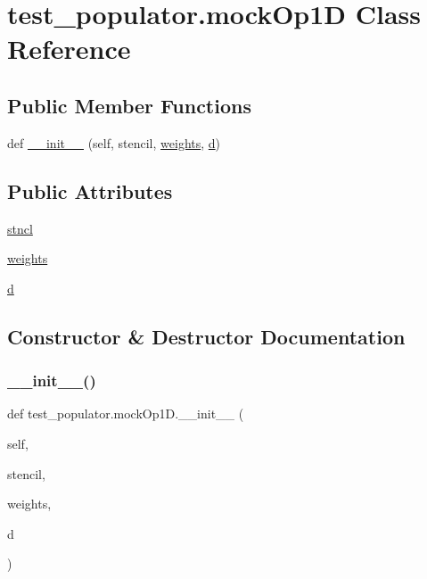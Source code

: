 \hypertarget{classtest__populator_1_1mockOp1D}{}\section{test\+\_\+populator.\+mock\+Op1D Class Reference}
\label{classtest__populator_1_1mockOp1D}
\subsection*{Public Member Functions}
\begin{DoxyCompactItemize}
\item 
def \hyperlink{classtest__populator_1_1mockOp1D_ac1e29378d4f07c7e390f0aedd224abf0}{\+\_\+\+\_\+init\+\_\+\+\_\+} (self, stencil, \hyperlink{classtest__populator_1_1mockOp1D_a6e64ee4b9c25ea872142ede86a9d40a8}{weights}, \hyperlink{classtest__populator_1_1mockOp1D_aa34be703e90c4cb0c7b62e2058b00a3c}{d})
\end{DoxyCompactItemize}
\subsection*{Public Attributes}
\begin{DoxyCompactItemize}
\item 
\hyperlink{classtest__populator_1_1mockOp1D_a11ff71958a6b7e5053db3b71b73d5887}{stncl}
\item 
\hyperlink{classtest__populator_1_1mockOp1D_a6e64ee4b9c25ea872142ede86a9d40a8}{weights}
\item 
\hyperlink{classtest__populator_1_1mockOp1D_aa34be703e90c4cb0c7b62e2058b00a3c}{d}
\end{DoxyCompactItemize}


\subsection{Constructor \& Destructor Documentation}
\mbox{\label{classtest__populator_1_1mockOp1D_ac1e29378d4f07c7e390f0aedd224abf0}} 
\subsubsection{\texorpdfstring{\+\_\+\+\_\+init\+\_\+\+\_\+()}{\_\_init\_\_()}}
{\footnotesize\ttfamily def test\+\_\+populator.\+mock\+Op1\+D.\+\_\+\+\_\+init\+\_\+\+\_\+ (\begin{DoxyParamCaption}\item[{}]{self,  }\item[{}]{stencil,  }\item[{}]{weights,  }\item[{}]{d }\end{DoxyParamCaption})}




